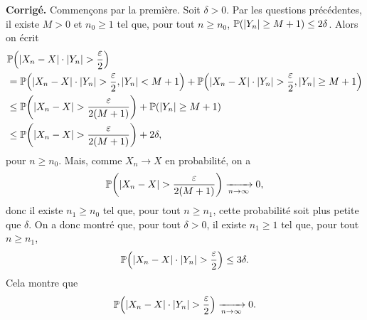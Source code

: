 \documentclass[a4paper,11pt]{article}
\let\originalleft\left
\let\originalright\right
\renewcommand{\left}{\mathopen{}\mathclose\bgroup\originalleft}
\renewcommand{\right}{\aftergroup\egroup\originalright}
\newcommand{\1}{\mathbbm{1}}
\newcommand{\Pp}[1]{\mathbb{P} \left(#1\right)}
\newcommand{\abs}[1]{\left\lvert#1\right\rvert}
\theoremstyle{plain}
\theoremstyle{definition}
\renewenvironment{comment}{\medskip\noindent \textcolor{BrickRed}{\textbf{Corrigé.}}}{}
\begin{document}
\begin{comment}
		Commençons par la première.
		Soit $\delta > 0$. Par les questions précédentes, il existe $M>0$ et $n_0\geq 1$ tel que, pour tout $n \geq n_0$, $\Pp{\abs{Y_n} \geq M+1} \leq 2\delta$.
		Alors on écrit
		\begin{align*}
		& \Pp{ \abs{X_n-X} \cdot \abs{Y_n} > \frac{\varepsilon}{2} } \\
		& = \Pp{ \abs{X_n-X} \cdot \abs{Y_n} > \frac{\varepsilon}{2},\abs{Y_n} < M+1}
		+ \Pp{ \abs{X_n-X} \cdot \abs{Y_n} > \frac{\varepsilon}{2},\abs{Y_n} \geq M+1} \\
		& \leq  \Pp{ \abs{X_n-X} > \frac{\varepsilon}{2(M+1)}}
		+ \Pp{\abs{Y_n} \geq M+1} \\
		& \leq \Pp{ \abs{X_n-X} > \frac{\varepsilon}{2(M+1)}} + 2 \delta,
		\end{align*}
		pour $n \geq n_0$. Mais, comme $X_n \to X$ en probabilité, on a 
		\begin{align*}
		\Pp{ \abs{X_n-X} > \frac{\varepsilon}{2(M+1)}}
		\xrightarrow[n\to\infty]{} 0,
		\end{align*}
		donc il existe $n_1 \geq n_0$ tel que, pour tout $n \geq n_1$, cette probabilité soit plus petite que $\delta$.
		On a donc montré que, pour tout $\delta >0$, il existe $n_1 \geq 1$ tel que, pour tout $n \geq n_1$,
		\[
		\Pp{ \abs{X_n-X} \cdot \abs{Y_n} > \frac{\varepsilon}{2} } \leq 3 \delta.
		\]
		Cela montre que 
		\[
		\Pp{ \abs{X_n-X} \cdot \abs{Y_n} > \frac{\varepsilon}{2} } 
		\xrightarrow[n\to\infty]{} 0.
		\]
		

\end{comment}
\end{document}

